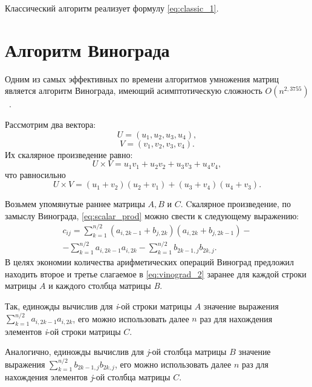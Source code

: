 Классический алгоритм реализует формулу \ref{eq:classic_1}.

\section{Алгоритм Винограда}
Одним из самых эффективных по времени алгоритмов умножения матриц является алгоритм Винограда, имеющий асимптотическую сложность $O(n^{2,3755})$~\cite{vinograd-haskell}.

Рассмотрим два вектора:
\begin{equation}
    U = (u_{1}, u_{2}, u_{3}, u_{4}),
\end{equation}
\begin{equation}
    V = (v_{1}, v_{2}, v_{3}, v_{4}).
\end{equation}
Их скалярное произведение равно:
\begin{equation}
    \label{eq:scalar_prod}
    U \times V = u_{1}v_{1} + u_{2}v_{2} + u_{3}v_{3} + u_{4}v_{4},
\end{equation}
что равносильно
\begin{equation}
    \label{eq:vinograd_1}
    U \times V = (u_{1} + v_{2})(u_{2} + v_{1}) + (u_{3} + v_{4})(u_{4} + v_{3}).
\end{equation}

Возьмем упомянутые раннее матрицы $A, B$ и $C$. Cкалярное произведение, по замыслу Винограда, \ref{eq:scalar_prod} можно свести к следующему выражению:
\begin{multline}
    \label{eq:vinograd_2}
    c_{ij} = \sum_{k = 1}^{n / 2}(a_{i,2k - 1} + b_{j, 2k})(a_{i,2k} + b_{j, 2k - 1}) - \\ - \sum_{k = 1}^{n / 2}a_{i,2k - 1}a_{i,2k} - \sum_{k = 1}^{n / 2}b_{2k - 1,j}b_{2k,j}.
\end{multline}
В целях экономии количества арифметических операций Виноград предложил находить второе и третье слагаемое в \ref{eq:vinograd_2} заранее для каждой строки матрицы $A$ и каждого столбца матрицы \textit{B}.

Так, единожды вычислив для \textit{i}-ой строки матрицы $A$ значение выражения $\sum_{k = 1}^{n / 2}a_{i,2k - 1}a_{i,2k}$, его можно использовать далее $n$ раз для нахождения элементов \textit{i}-ой строки матрицы $C$.  

Аналогично, единожды вычислив для \textit{j}-ой столбца матрицы $B$ значение выражения $\sum_{k = 1}^{n / 2}b_{2k - 1,j}b_{2k,j}$, его можно использовать далее $n$ раз для нахождения элементов \textit{j}-ой столбца матрицы $C$.

